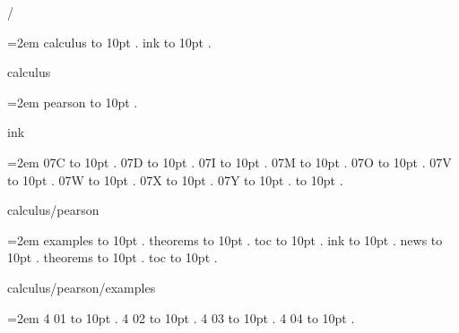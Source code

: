 
\parindent=0pt
\pdfpagewidth=148mm
\pdfpageheight=210mm
\hsize=128mm
\vsize=190mm
\pdfhorigin=0pt
\pdfvorigin=0pt
\hoffset=10mm
\voffset=10mm
/
\par\begingroup
\leftskip=2em
\smallskip
calculus \leaders\hbox to 10pt {\hss.\hss}  \hfill {}
\smallskip
ink \leaders\hbox to 10pt {\hss.\hss}  \hfill {}
\smallskip
\medskip
\par\endgroup
\bigskip
{}
calculus
\par\begingroup
\leftskip=2em
\smallskip
pearson \leaders\hbox to 10pt {\hss.\hss}  \hfill {}
\smallskip
\medskip
\par\endgroup
\bigskip
{}
ink
\par\begingroup
\leftskip=2em
\smallskip
\medskip
07C \leaders\hbox to 10pt {\hss.\hss}  \hfill {}
\smallskip
07D \leaders\hbox to 10pt {\hss.\hss}  \hfill {}
\smallskip
07I \leaders\hbox to 10pt {\hss.\hss}  \hfill {}
\smallskip
07M \leaders\hbox to 10pt {\hss.\hss}  \hfill {}
\smallskip
07O \leaders\hbox to 10pt {\hss.\hss}  \hfill {}
\smallskip
07V \leaders\hbox to 10pt {\hss.\hss}  \hfill {}
\smallskip
07W \leaders\hbox to 10pt {\hss.\hss}  \hfill {}
\smallskip
07X \leaders\hbox to 10pt {\hss.\hss}  \hfill {}
\smallskip
07Y \leaders\hbox to 10pt {\hss.\hss}  \hfill {}
 \leaders\hbox to 10pt {\hss.\hss}  \hfill {}
\smallskip
\par\endgroup
\bigskip
{}
calculus/pearson
\par\begingroup
\leftskip=2em
\smallskip
examples \leaders\hbox to 10pt {\hss.\hss}  \hfill {}
\smallskip
theorems \leaders\hbox to 10pt {\hss.\hss}  \hfill {}
\smallskip
toc \leaders\hbox to 10pt {\hss.\hss}  \hfill {}
\smallskip
\medskip
ink \leaders\hbox to 10pt {\hss.\hss}  \hfill {}
\smallskip
news \leaders\hbox to 10pt {\hss.\hss}  \hfill {}
\smallskip
theorems \leaders\hbox to 10pt {\hss.\hss}  \hfill {}
\smallskip
toc \leaders\hbox to 10pt {\hss.\hss}  \hfill {}
\smallskip
\par\endgroup
\bigskip
{}
calculus/pearson/examples
\par\begingroup
\leftskip=2em
\smallskip
{} 4 01 \leaders\hbox to 10pt {\hss.\hss}  \hfill {}
 4 02 \leaders\hbox to 10pt {\hss.\hss}  \hfill {}
 4 03 \leaders\hbox to 10pt {\hss.\hss}  \hfill {}
 4 04 \leaders\hbox to 10pt {\hss.\hss}  \hfill {}
